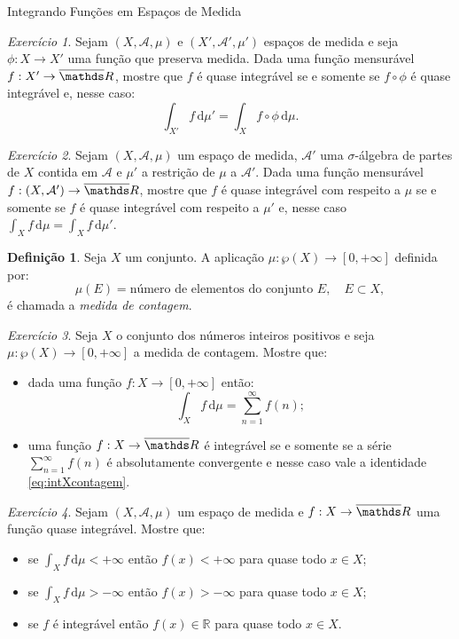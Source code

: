 \documentclass[oneside,final,11pt]{amsbook}
\newcommand{\R}{\mathds R}
\newcommand{\dd}{\mathrm d}
\theoremstyle{remark}\newtheorem{exercise}{Exercício}[chapter]
\theoremstyle{remark}\newtheorem{*exercise}[exercise]{\hbox to 0pt{\hskip 0pt minus 1fil*}Exercício}
\theoremstyle{definition}\newtheorem{exdefin}{Definição}[chapter]
\theoremstyle{plain}\newtheorem{teo}{Teorema}[section]
\theoremstyle{plain}\newtheorem{lem}[teo]{Lema}
\theoremstyle{plain}\newtheorem{prop}[teo]{Proposição}
\theoremstyle{plain}\newtheorem{cor}[teo]{Corolário}
\theoremstyle{definition}\newtheorem{defin}[teo]{Definição}
\theoremstyle{remark}\newtheorem{rem}[teo]{Observação}
\theoremstyle{definition}\newtheorem{notation}[teo]{Notação}
\theoremstyle{definition}\newtheorem{convention}[teo]{Convenção}
\theoremstyle{definition}\newtheorem{example}[teo]{Exemplo}
\numberwithin{section}{chapter}
\numberwithin{equation}{section}
\begin{document}
\begin{chapter}{Integrando Funções em Espaços de Medida}
\begin{exercise}\label{exe:measurepreserving}
Sejam $(X,\mathcal A,\mu)$ e $(X',\mathcal A',\mu')$ espaços de medida e seja $\phi:X\to X'$
uma função que preserva medida. Dada uma função mensurável $f:X'\to\overline\R$, mostre
que $f$ é quase integrável se e somente se $f\circ\phi$ é quase integrável e, nesse caso:
\[\int_{X'}f\,\dd\mu'=\int_Xf\circ\phi\,\dd\mu.\]
\end{exercise}

\begin{exercise}\label{exe:sigmaalgmenor}
Sejam $(X,\mathcal A,\mu)$ um espaço de medida, $\mathcal A'$ uma $\sigma$-álgebra de partes de $X$ contida
em $\mathcal A$ e $\mu'$ a restrição de $\mu$ a $\mathcal A'$. Dada uma função mensurável
$f:(X,\mathcal A')\to\overline\R$, mostre que $f$ é quase integrável com respeito a $\mu$ se e somente se
$f$ é quase integrável com respeito a $\mu'$ e, nesse caso $\int_Xf\,\dd\mu=\int_Xf\,\dd\mu'$.
\end{exercise}

\begin{exdefin}\label{thm:defmedcont}
Seja $X$ um conjunto. A aplicação $\mu:\wp(X)\to[0,+\infty]$ definida por:
\[\mu(E)=\text{número de elementos do conjunto $E$},\quad E\subset X,\]
é chamada a {\em medida de contagem}.
\end{exdefin}

\begin{exercise}
Seja $X$ o conjunto dos números inteiros positivos e seja $\mu:\wp(X)\to[0,+\infty]$ a medida
de contagem. Mostre que:
\begin{itemize}
\item dada uma função $f:X\to[0,+\infty]$ então:
\begin{equation}\label{eq:intXcontagem}
\int_Xf\,\dd\mu=\sum_{n=1}^\infty f(n);
\end{equation}
\item uma função $f:X\to\overline\R$ é integrável se e somente se
a série $\sum_{n=1}^\infty f(n)$ é absolutamente convergente
e nesse caso vale a identidade \eqref{eq:intXcontagem}.
\end{itemize}
\end{exercise}

\begin{exercise}\label{exe:finitaqs}
Sejam $(X,\mathcal A,\mu)$ um espaço de medida e $f:X\to\overline\R$ uma função quase integrável.
Mostre que:
\begin{itemize}
\item se $\int_Xf\,\dd\mu<+\infty$ então $f(x)<+\infty$ para quase todo $x\in X$;
\item se $\int_Xf\,\dd\mu>-\infty$ então $f(x)>-\infty$ para quase todo $x\in X$;
\item se $f$ é integrável então $f(x)\in\R$ para quase todo $x\in X$.
\end{itemize}
\end{exercise}


\end{chapter}
\end{document}
